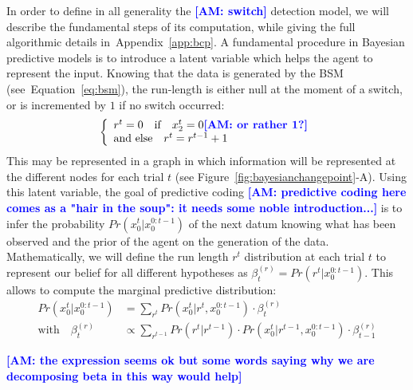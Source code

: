 \documentclass[12pt,english]{article}%
\newcommand{\choice}[1]{ %
	\left\{ %
		\begin{array}{l} #1 \end{array} %
	\right. }
\newcommand{\eql}[1]{\begin{equation}#1\end{equation}}
\newcommand{\eqa}[1]{\begin{align}#1\end{align}}
\newcommand{\seeFig}[1]{Figure~\ref{fig:#1}}
\newcommand{\seeEq}[1]{Equation~\ref{eq:#1}}
\newcommand{\seeApp}[1]{Appendix~\ref{app:#1}}
\newcommand{\AM}[1]{\textbf{\textcolor{blue}{[AM: #1]}}}
\begin{document}
In order to define in all generality the \AM{switch} detection model,
we will describe the fundamental steps of its computation,
while giving the full algorithmic details in~\seeApp{bcp}.
A fundamental procedure in Bayesian predictive models is to introduce
a latent variable which helps the agent to represent the input.
Knowing that the data is generated by the BSM (see~\seeEq{bsm}),
the run-length is either null at the moment of a switch,
or is incremented by $1$ if no switch occurred:
\eql{\choice{
r^t = 0 \quad \text{if} \quad x_2^t=0 \AM{or rather 1?} \\
\text{and else} \quad r^t = r^{t-1} +1 }\label{eq:run_length}}%
This may be represented in a graph
in which information will be represented at the different nodes for each trial $t$ (see \seeFig{bayesianchangepoint}-A).
Using this latent variable, the goal of predictive coding \AM{predictive coding here comes as a "hair in the soup": it needs some noble introduction...} is to
infer the probability $Pr(x_0^t | x_0^{0:t-1})$ of the next datum
knowing what has been observed and
the prior of the agent on the generation of the data.
Mathematically, we will define the run length $r^t$ distribution
at each trial $t$ to represent our belief
for all different hypotheses as $\beta^{(r)}_t=Pr(r^t | x_0^{0:t-1})$.
This allows to compute the marginal predictive distribution:
\eqa{
Pr(x_0^t | x_0^{0:t-1}) &= \sum_{r^{t}} Pr(x_0^t | r^{t}, x_0^{0:t-1}) \cdot  \beta^{(r)}_t \\
\text{with} \quad \beta^{(r)}_t &\propto \sum_{r^{t-1}}  Pr(r^t | r^{t-1}) \cdot  Pr(x_0^t | r^{t-1}, x_0^{0:t-1}) \cdot  \beta^{(r)}_{t-1}
\label{eq:pred}
}

\AM{the expression seems ok but some words saying why we are decomposing beta in this way would help}
\end{document}

